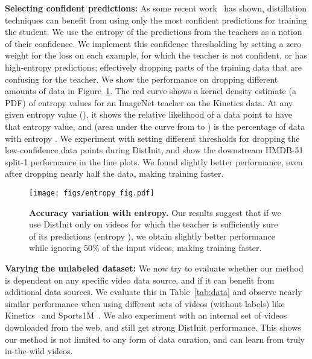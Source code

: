 \documentclass[10pt,twocolumn,letterpaper]{article}
\newcommand{\METHOD}[0]{DistInit}
\begin{document}
{\noindent \bf Selecting confident predictions:}
As some recent work~\cite{radosavovic2018data} has shown, distillation techniques can benefit from using only
the most confident predictions for training the student. We use the entropy of the predictions from the teachers as
a notion of their confidence. 
We implement this confidence thresholding by setting a zero weight for the loss on each example, for which the 
teacher is not confident, or has high-entropy predictions; effectively dropping parts of the training data
that are confusing for the teacher.
We show the performance on dropping different amounts of data in Figure~\ref{fig:entropy}.
The red curve shows a kernel density estimate (a PDF) of entropy values for an ImageNet teacher on the Kinetics data. At any given entropy value (), it shows the relative likelihood of a data point to have that entropy value, and  (area under the curve from  to ) is the percentage of data with entropy . We experiment with setting different thresholds for dropping the low-confidence data points during \METHOD{}, and show the downstream HMDB-51 split-1 performance in the line plots.
We found slightly better performance, even after dropping nearly half the data, making training faster.


\begin{figure}[t]
  \centering
  \begin{minipage}[c]{0.45\linewidth}
    \texttt{[image: figs/entropy\_fig.pdf]}
  \end{minipage}\hfill
  \begin{minipage}[c]{0.54\linewidth}
    \caption{
    {\bf Accuracy variation with entropy.}
    Our results suggest that if we use \METHOD{} only on videos for which the teacher is sufficiently sure of its predictions (entropy ), we obtain slightly better performance while ignoring 50\% of the input videos, making training faster.
    }\label{fig:entropy}
  \end{minipage}
\end{figure}

{\noindent \bf Varying the unlabeled dataset:}\label{sec:expt:distill_data}
We now try to evaluate whether our method is dependent on any specific video data source, and if it can benefit from additional
data sources. We evaluate this in Table~\ref{tab:data} and observe nearly similar performance when using
different sets of videos (without labels) like Kinetics~\cite{kay2017kinetics} and Sports1M~\cite{Karpathy_14}.
We also experiment with an internal set of videos downloaded from the web, and still get strong \METHOD{} performance. This shows our method is not limited to any 
form of data curation, and can learn from truly in-the-wild videos.
\end{document}
